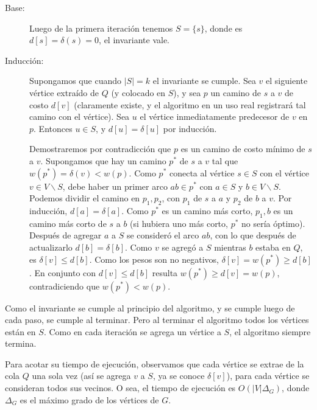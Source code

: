   \begin{description}
  \item[Base:]
    Luego de la primera iteración tenemos \(S = \{ s \}\),
    donde es \(d[s] = \delta(s) = 0\),
    el invariante vale.
  \item[Inducción:]
    Supongamos que cuando \(\lvert S \rvert = k\)
    el invariante se cumple.
    Sea \(v\) el siguiente vértice extraído de \(Q\)
    (y colocado en \(S\)),
    y sea \(p\) un camino de \(s\) a \(v\) de costo \(d[v]\)
    (claramente existe,
     y el algoritmo en un uso real registrará tal camino con el vértice).
    Sea \(u\) el vértice inmediatamente predecesor de \(v\) en \(p\).
    Entonces \(u \in S\),
    y \(d[u] = \delta[u]\) por inducción.

    Demostraremos por contradicción
    que \(p\) es un camino de costo mínimo de \(s\) a \(v\).
    Supongamos que hay un camino \(p^*\) de \(s\) a \(v\)
    tal que \(w(p^*) = \delta(v) < w(p)\).
    Como \(p^*\) conecta al vértice \(s \in S\)
    con el vértice \(v \in V \smallsetminus S\),
    debe haber un primer arco \(a b \in p^*\)
    con \(a \in S\) y \(b \in V \smallsetminus S\).
    Podemos dividir el camino en \(p_1, p_2\),
    con \(p_1\) de \(s\) a \(a\) y \(p_2\) de \(b\) a \(v\).
    Por inducción,
    \(d[a] = \delta[a]\).
    Como \(p^*\) es un camino más corto,
    \(p_1, b\) es un camino más corto de \(s\) a \(b\)
    (si hubiera uno más corto,
     \(p^*\) no sería óptimo).
    Después de agregar \(a\) a \(S\)
    se consideró el arco \(a b\),
    con lo que después de actualizarlo \(d[b] = \delta[b]\).
    Como \(v\) se agregó a \(S\) mientras \(b\) estaba en \(Q\),
    es \(\delta[v] \le d[b]\).
    Como los pesos son no negativos,
    \(\delta[v] = w(p^*) \ge d[b]\).
    En conjunto con \(d[v] \le d[b]\)
    resulta \(w(p^*) \ge d[v] = w(p)\),
    contradiciendo que \(w(p^*) < w(p)\).
  \end{description}
  Como el invariante se cumple al principio del algoritmo,
  y se cumple luego de cada paso,
  se cumple al terminar.
  Pero al terminar el algoritmo todos los vértices están en \(S\).
  Como en cada iteración se agrega un vértice a \(S\),
  el algoritmo siempre termina.

  Para acotar su tiempo de ejecución,
  observamos que cada vértice se extrae de la cola \(Q\) una sola vez
  (así se agrega \(v\) a \(S\),
   ya se conoce \(\delta[v]\)),
  para cada vértice se consideran todos sus vecinos.
  O sea,
  el tiempo de ejecución es \(O(\lvert V \rvert \Delta_G)\),
  donde \(\Delta_G\) es el máximo grado de los vértices de \(G\).

